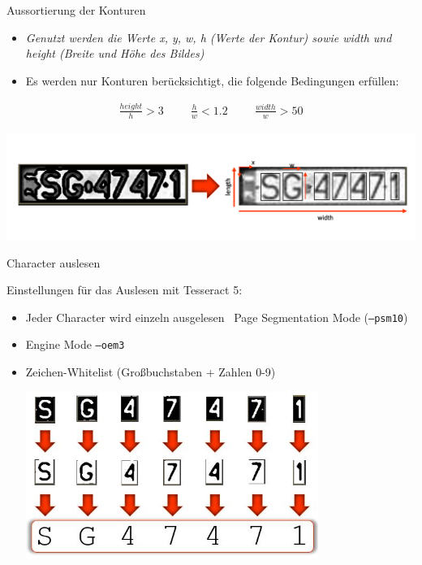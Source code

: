 \begin{frame}{Aussortierung der Konturen}
    \begin{itemize}
        \item {\textit{\scriptsize Genutzt werden die Werte x, y, w, h (Werte der Kontur) sowie width und height (Breite und Höhe des Bildes)}}
        \item {\scriptsize Es werden nur Konturen berücksichtigt, die folgende Bedingungen erf\"ullen:}
    \end{itemize}
    \begin{align*}
        \frac{height}{h} > 3
        \hspace{1cm}
        \frac{h}{w} < 1.2
        \hspace{1cm}
        \frac{width}{w} > 50
    \end{align*}
    \begin{center}
        \includegraphics[width=\textwidth]{img/contours}
    \end{center}
\end{frame}

\begin{frame}{Character auslesen}

    {\footnotesize Einstellungen für das Auslesen mit Tesseract 5:}
    \begin{itemize}
        \item {\scriptsize Jeder Character wird einzeln ausgelesen \rightarrow  \, Page Segmentation Mode (\texttt{--psm10})}
        \item {\scriptsize Engine Mode \texttt{--oem3}}
        \item {\scriptsize Zeichen-Whitelist (Großbuchstaben + Zahlen 0-9)}

              \begin{center}
                  \includegraphics[width=0.75\textwidth]{img/char_preprocessing.jpg}
              \end{center}

    \end{itemize}
\end{frame}


